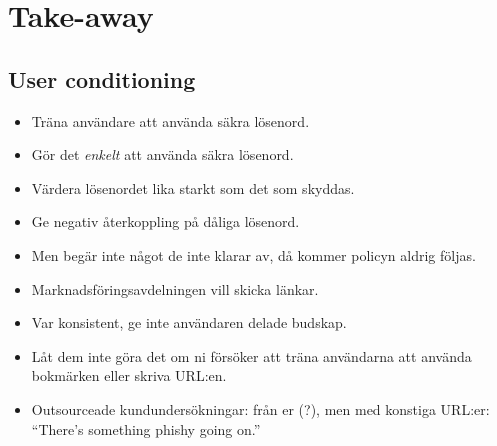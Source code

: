\documentclass{beamer}
\begin{document}
\section{Take-away}

\subsection{User conditioning}

\begin{frame}
  \begin{itemize}
    \item Träna användare att använda säkra lösenord.
    \item Gör det \emph{enkelt} att använda säkra lösenord.
    \item Värdera lösenordet lika starkt som det som skyddas.
    \item Ge negativ återkoppling på dåliga lösenord.
    \item Men begär inte något de inte klarar av, då kommer policyn aldrig 
      följas.
  \end{itemize}
\end{frame}

\begin{frame}
  \begin{itemize}
    \item Marknadsföringsavdelningen vill skicka länkar.
    \item Var konsistent, ge inte användaren delade budskap.
    \item Låt dem inte göra det om ni försöker att träna användarna att använda 
      bokmärken eller skriva URL:en.
    \item Outsourceade kundundersökningar: från er (?), men med konstiga 
      URL:er:
      \enquote{There's something phishy going on.}
  \end{itemize}
\end{frame}



\begin{frame}[allowframebreaks]
	\small
  \printbibliography{}
\end{frame}
\end{document}
